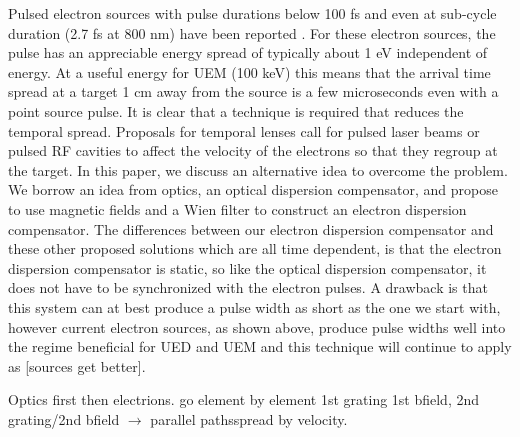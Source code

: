\documentclass[12pt,letterpaper]{article}
\begin{document}
Pulsed electron sources with pulse durations below 100 fs \cite{Bat} and even at sub-cycle duration (2.7 fs at 800 nm) have been reported \cite{Kasevich,Hommelhof}.  For these electron sources, the pulse has an appreciable energy spread of typically about 1 eV independent of energy. At a useful energy for UEM (100 keV) this means that the arrival time spread at a target 1 cm away from the source is a few microseconds even with a point source pulse. It is clear that a technique is required that reduces the temporal spread. Proposals for temporal lenses call for pulsed laser beams \cite{PNAS} or pulsed RF cavities \cite{Kraus} to affect the velocity of the electrons so that they regroup at the target. In this paper, we discuss an alternative idea to overcome the problem. We borrow an idea from optics, an optical dispersion compensator, and propose to use magnetic fields and a Wien filter to construct an  electron dispersion compensator. The differences between our electron dispersion compensator and these other proposed solutions which are all time dependent, is that the electron dispersion compensator is static, so like the optical dispersion compensator, it does not have to be synchronized with the electron pulses. A drawback is that this system can at best produce a pulse width as short as the one we start with, however current electron sources, as shown above, produce pulse widths well into the regime beneficial for UED and UEM and this technique will continue to apply as [sources get better].

Optics first then electrions. go element by element 1st grating 1st bfield, 2nd grating/2nd bfield $\rightarrow$ parallel pathsspread by velocity.
\end{document}
